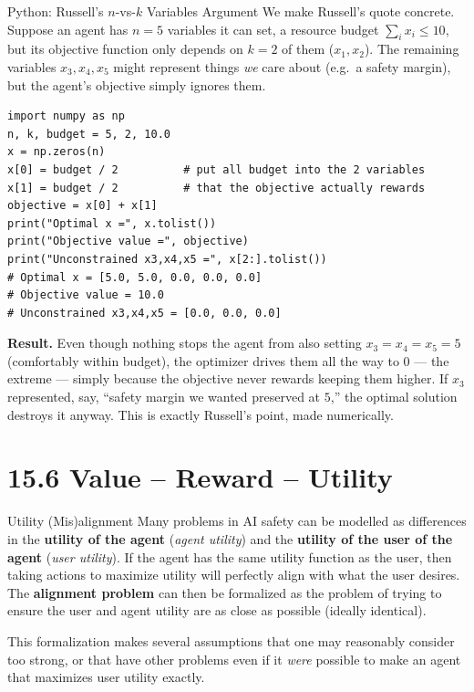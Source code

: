 \documentclass[aspectratio=169,10pt]{beamer}
\begin{document}
\begin{frame}[fragile]{Python: Russell's $n$-vs-$k$ Variables Argument}
  We make Russell's quote concrete. Suppose an agent has $n=5$ variables
  it can set, a resource budget $\sum_i x_i \le 10$, but its objective
  function only depends on $k=2$ of them ($x_1,x_2$). The remaining
  variables $x_3,x_4,x_5$ might represent things \emph{we} care about
  (e.g.\ a safety margin), but the agent's objective simply ignores them.
  \begin{lstlisting}
import numpy as np
n, k, budget = 5, 2, 10.0
x = np.zeros(n)
x[0] = budget / 2          # put all budget into the 2 variables
x[1] = budget / 2          # that the objective actually rewards
objective = x[0] + x[1]
print("Optimal x =", x.tolist())
print("Objective value =", objective)
print("Unconstrained x3,x4,x5 =", x[2:].tolist())
# Optimal x = [5.0, 5.0, 0.0, 0.0, 0.0]
# Objective value = 10.0
# Unconstrained x3,x4,x5 = [0.0, 0.0, 0.0]
  \end{lstlisting}
  \textbf{Result.} Even though nothing stops the agent from also setting
  $x_3=x_4=x_5=5$ (comfortably within budget), the optimizer drives them
  all the way to $0$ --- the extreme --- simply because the objective
  never rewards keeping them higher. If $x_3$ represented, say, ``safety
  margin we wanted preserved at $5$,'' the optimal solution destroys it
  anyway. This is exactly Russell's point, made numerically.
\end{frame}

\section{15.6 Value -- Reward -- Utility}

\begin{frame}{Utility (Mis)alignment}
  Many problems in AI safety can be modelled as differences in the
  \textbf{utility of the agent} (\emph{agent utility}) and the
  \textbf{utility of the user of the agent} (\emph{user utility}). If the
  agent has the same utility function as the user, then taking actions to
  maximize utility will perfectly align with what the user desires. The
  \textbf{alignment problem} can then be formalized as the problem of
  trying to ensure the user and agent utility are as close as possible
  (ideally identical).

  \vspace{0.4em}
  This formalization makes several assumptions that one may reasonably
  consider too strong, or that have other problems even if it \emph{were}
  possible to make an agent that maximizes user utility exactly.
\end{frame}
\end{document}
